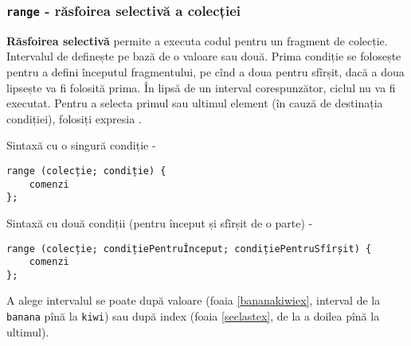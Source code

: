 \begin{sourcecode}
    \label{filterdataex}
    \inputminted[linenos]{icl}{../sources/filterdataex.icL}
\end{sourcecode}

\begin{listing}[t]
    \label{filterindexex}
    \inputminted[linenos]{icl}{../sources/filterindexex.icL}
\end{listing}

\subsubsection{\texttt{range} - răsfoirea selectivă a colecției}

{\bf Răsfoirea selectivă} permite a executa codul pentru un fragment de colecție. Intervalul de definește pe bază de o valoare sau două. Prima condiție se folosește pentru a defini începutul fragmentului, pe cînd a doua pentru sfîrșit, dacă a doua lipsește va fi folosită prima. În lipsă de un interval corespunzător, ciclul nu va fi executat. Pentru a selecta primul sau ultimul element (în cauză de destinația condiției), folosiți expresia \true{}.

Sintaxă cu o singură condiție -
\begin{verbatim}
range (colecție; condiție) {
	comenzi
};
\end{verbatim}

Sintaxă cu două condiții (pentru început și sfîrșit de o parte) -
\begin{verbatim}
range (colecție; condițiePentruÎnceput; condițiePentruSfîrșit) {
	comenzi
};
\end{verbatim}

A alege intervalul se poate după valoare (foaia \ref{bananakiwiex}, interval de la \texttt{banana} pînă la \texttt{kiwi}) sau după index (foaia \ref{seclastex}, de la a doilea pînă la ultimul).

\begin{sourcecode}
    \label{bananakiwiex}
    \inputminted[linenos]{icl}{../sources/bananakiwiex.icL}
\end{sourcecode}

\begin{sourcecode}
    \vspace{-2em}
    \label{seclastex}
    \inputminted[linenos]{icl}{../sources/seclastex.icL}
\end{sourcecode}
